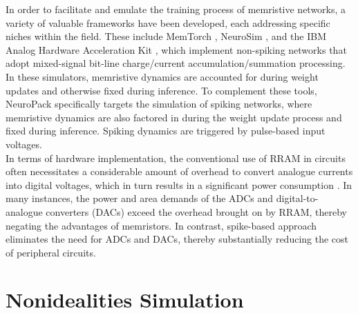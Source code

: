 \noindent In order to facilitate and emulate the training process of memristive networks, a variety of valuable frameworks have been developed, each addressing specific niches within the field. These include MemTorch \cite{lammie2022memtorch}, NeuroSim \cite{chen2018neurosim}, and the IBM Analog Hardware Acceleration Kit \cite{rasch2021flexible}, which implement non-spiking networks that adopt mixed-signal bit-line charge/current accumulation/summation processing. In these simulators, memristive dynamics are accounted for during weight updates and otherwise fixed during inference. To complement these tools, NeuroPack \cite{huang2022neuropack} specifically targets the simulation of spiking networks, where memristive dynamics are also factored in during the weight update process and fixed during inference. Spiking dynamics are triggered by pulse-based input voltages.\\


\noindent In terms of hardware implementation, the conventional use of RRAM in circuits often necessitates a considerable amount of overhead to convert analogue currents into digital voltages, which in turn results in a significant power consumption \cite{cai2019fully}. In many instances, the power and area demands of the ADCs and digital-to-analogue converters (DACs) exceed the overhead brought on by RRAM, thereby negating the advantages of memristors. In contrast, spike-based approach eliminates the need for ADCs and DACs, thereby substantially reducing the cost of peripheral circuits.\\


\section[Nonidealities Simulation]{Nonidealities Simulation}


